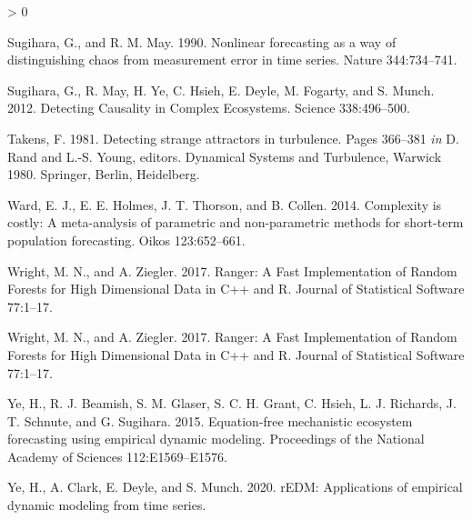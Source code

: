 \documentclass[
]{article}
\newlength{\cslhangindent}
\newenvironment{CSLReferences}[2] %
 {%
  \setlength{\parindent}{0pt}
  \ifodd #1 \everypar{\setlength{\hangindent}{\cslhangindent}}\ignorespaces\fi
  \ifnum #2 > 0
  \setlength{\parskip}{#2\baselineskip}
  \fi
 }%
 {}
\begin{document}
\begin{CSLReferences}{1}{0}
\leavevmode\hypertarget{ref-sugihara1990}{}%
Sugihara, G., and R. M. May. 1990. Nonlinear forecasting as a way of distinguishing chaos from measurement error in time series. Nature 344:734--741.

\leavevmode\hypertarget{ref-sugihara2012}{}%
Sugihara, G., R. May, H. Ye, C. Hsieh, E. Deyle, M. Fogarty, and S. Munch. 2012. Detecting {Causality} in {Complex Ecosystems}. Science 338:496--500.

\leavevmode\hypertarget{ref-takens1981}{}%
Takens, F. 1981. Detecting strange attractors in turbulence. Pages 366--381 \emph{in} D. Rand and L.-S. Young, editors. Dynamical {Systems} and {Turbulence}, {Warwick} 1980. {Springer}, {Berlin, Heidelberg}.

\leavevmode\hypertarget{ref-ward2014}{}%
Ward, E. J., E. E. Holmes, J. T. Thorson, and B. Collen. 2014. Complexity is costly: A meta-analysis of parametric and non-parametric methods for short-term population forecasting. Oikos 123:652--661.

\leavevmode\hypertarget{ref-wright2017}{}%
Wright, M. N., and A. Ziegler. 2017. Ranger: {A Fast Implementation} of {Random Forests} for {High Dimensional Data} in {C}++ and {R}. Journal of Statistical Software 77:1--17.

\leavevmode\hypertarget{ref-wright2017}{}%
Wright, M. N., and A. Ziegler. 2017. Ranger: {A Fast Implementation} of {Random Forests} for {High Dimensional Data} in {C}++ and {R}. Journal of Statistical Software 77:1--17.

\leavevmode\hypertarget{ref-ye2015}{}%
Ye, H., R. J. Beamish, S. M. Glaser, S. C. H. Grant, C. Hsieh, L. J. Richards, J. T. Schnute, and G. Sugihara. 2015. Equation-free mechanistic ecosystem forecasting using empirical dynamic modeling. Proceedings of the National Academy of Sciences 112:E1569--E1576.

\leavevmode\hypertarget{ref-ye2020}{}%
Ye, H., A. Clark, E. Deyle, and S. Munch. 2020. rEDM: Applications of empirical dynamic modeling from time series.

\end{CSLReferences}
\end{document}
